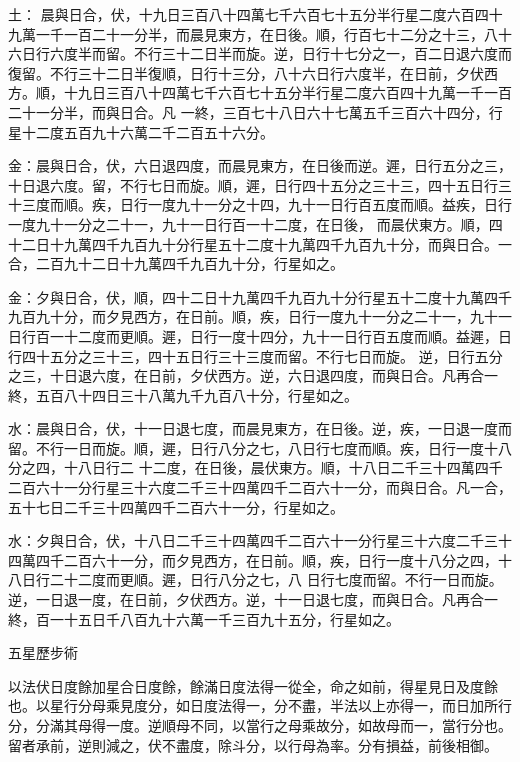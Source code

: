 \begin{pinyinscope}
 土：
 晨與日合，伏，十九日三百八十四萬七千六百七十五分半行星二度六百四十九萬一千一百二十一分半，而晨見東方，在日後。順，行百七十二分之十三，八十六日行六度半而留。不行三十二日半而旋。逆，日行十七分之一，百二日退六度而復留。不行三十二日半復順，日行十三分，八十六日行六度半，在日前，夕伏西方。順，十九日三百八十四萬七千六百七十五分半行星二度六百四十九萬一千一百二十一分半，而與日合。凡
 一終，三百七十八日六十七萬五千三百六十四分，行星十二度五百九十六萬二千二百五十六分。



 金：晨與日合，伏，六日退四度，而晨見東方，在日後而逆。遲，日行五分之三，十日退六度。留，不行七日而旋。順，遲，日行四十五分之三十三，四十五日行三十三度而順。疾，日行一度九十一分之十四，九十一日行百五度而順。益疾，日行一度九十一分之二十一，九十一日行百一十二度，在日後，
 而晨伏東方。順，四十二日十九萬四千九百九十分行星五十二度十九萬四千九百九十分，而與日合。一合，二百九十二日十九萬四千九百九十分，行星如之。



 金：夕與日合，伏，順，四十二日十九萬四千九百九十分行星五十二度十九萬四千九百九十分，而夕見西方，在日前。順，疾，日行一度九十一分之二十一，九十一日行百一十二度而更順。遲，日行一度十四分，九十一日行百五度而順。益遲，日行四十五分之三十三，四十五日行三十三度而留。不行七日而旋。
 逆，日行五分之三，十日退六度，在日前，夕伏西方。逆，六日退四度，而與日合。凡再合一終，五百八十四日三十八萬九千九百八十分，行星如之。



 水：晨與日合，伏，十一日退七度，而晨見東方，在日後。逆，疾，一日退一度而留。不行一日而旋。順，遲，日行八分之七，八日行七度而順。疾，日行一度十八分之四，十八日行二
 十二度，在日後，晨伏東方。順，十八日二千三十四萬四千二百六十一分行星三十六度二千三十四萬四千二百六十一分，而與日合。凡一合，五十七日二千三十四萬四千二百六十一分，行星如之。



 水：夕與日合，伏，十八日二千三十四萬四千二百六十一分行星三十六度二千三十四萬四千二百六十一分，而夕見西方，在日前。順，疾，日行一度十八分之四，十八日行二十二度而更順。遲，日行八分之七，八
 日行七度而留。不行一日而旋。逆，一日退一度，在日前，夕伏西方。逆，十一日退七度，而與日合。凡再合一終，百一十五日千八百九十六萬一千三百九十五分，行星如之。



 五星歷步術



 以法伏日度餘加星合日度餘，餘滿日度法得一從全，命之如前，得星見日及度餘也。以星行分母乘見度分，如日度法得一，分不盡，半法以上亦得一，而日加所行分，分滿其母得一度。逆順母不同，以當行之母乘故分，如故母而一，當行分也。留者承前，逆則減之，伏不盡度，除斗分，以行母為率。分有損益，前後相御。




\end{pinyinscope}

